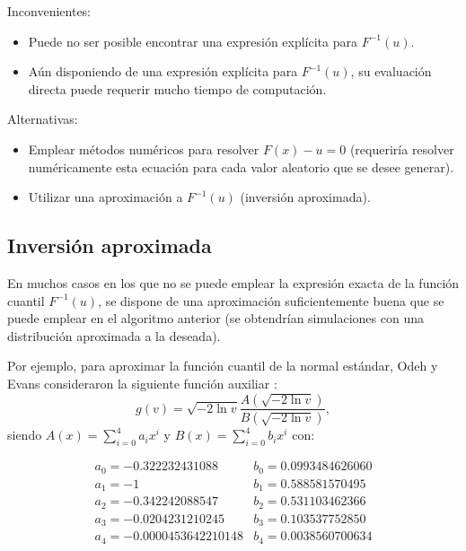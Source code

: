 \documentclass[
]{book}
\theoremstyle{break}
\theoremstyle{definition}
\theoremstyle{definition}
\theoremstyle{definition}
\theoremstyle{remark}
\begin{document}
Inconvenientes:

\begin{itemize}
\item
  Puede no ser posible encontrar una expresión explícita para
  \(F^{-1}\left( u\right).\)
\item
  Aún disponiendo de una expresión explícita para
  \(F^{-1}\left( u\right)\), su evaluación directa puede requerir
  mucho tiempo de computación.
\end{itemize}

Alternativas:

\begin{itemize}
\item
  Emplear métodos numéricos para resolver \(F\left( x\right) -u=0\)
  (requeriría resolver numéricamente esta ecuación para cada
  valor aleatorio que se desee generar).
\item
  Utilizar una aproximación a \(F^{-1}\left( u\right)\)
  (inversión aproximada).
\end{itemize}

\hypertarget{inversiuxf3n-aproximada}{%
\subsection{Inversión aproximada}\label{inversiuxf3n-aproximada}}

En muchos casos en los que no se puede emplear la expresión exacta de la función
cuantil \(F^{-1}\left( u\right)\), se dispone de una aproximación suficientemente
buena que se puede emplear en el algoritmo anterior (se obtendrían simulaciones
con una distribución aproximada a la deseada).

Por ejemplo, para aproximar la función cuantil de la normal estándar,
Odeh y Evans consideraron la siguiente función auxiliar :
\[ g\left( v\right)  =\sqrt{-2\ln v}\frac{A\left( \sqrt{-2\ln v}\right)
}{B\left( \sqrt{-2\ln v}\right)  },\]
siendo \(A\left( x\right) =\sum_{i=0}^{4}a_{i}x^{i}\)
y \(B\left( x\right) =\sum_{i=0}^{4}b_{i}x^{i}\) con:

\[\begin{array}{ll}
a_{0}=-0.322232431088 &  b_{0}=0.0993484626060 \\
a_{1}=-1 &  b_{1}=0.588581570495 \\
a_{2}=-0.342242088547 & b_{2}=0.531103462366 \\
a_{3}=-0.0204231210245 & b_{3}=0.103537752850 \\
a_{4}=-0.0000453642210148 & b_{4}=0.0038560700634
\end{array}\]
\end{document}
